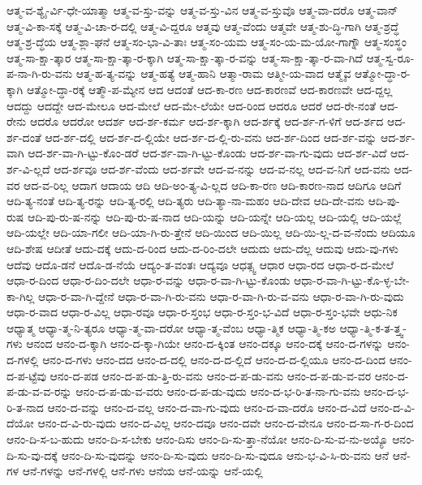 {ಆತ್ಮ-ವ-ಶ್ಯೈ-ರ್ವಿ-ಧೇ-ಯಾತ್ಮಾ
ಆತ್ಮ-ವ-ಸ್ತು-ವನ್ನು
ಆತ್ಮ-ವ-ಸ್ತು-ವಿನ
ಆತ್ಮ-ವ-ಸ್ತುವೊ
ಆತ್ಮ-ವಾ-ದರೊ
ಆತ್ಮ-ವಾನ್
ಆತ್ಮ-ವಿ-ಕಾ-ಸಕ್ಕೆ
ಆತ್ಮ-ವಿ-ಚಾ-ರ-ದಲ್ಲಿ
ಆತ್ಮ-ವಿ-ದ್ದರೂ
ಆತ್ಮವು
ಆತ್ಮ-ವೆಂದು
ಆತ್ಮವೇ
ಆತ್ಮ-ಶು-ದ್ಧಿ-ಗಾಗಿ
ಆತ್ಮ-ಶ್ರದ್ಧೆ
ಆತ್ಮ-ಶ್ರ-ದ್ಧೆಯ
ಆತ್ಮ-ಶ್ಲಾ-ಘನೆ
ಆತ್ಮ-ಸಂ-ಭಾ-ವಿ-ತಾಃ
ಆತ್ಮ-ಸಂ-ಯಮ
ಆತ್ಮ-ಸಂ-ಯ-ಮ-ಯೋ-ಗಾಗ್ನೌ
ಆತ್ಮ-ಸಂಸ್ಥಂ
ಆತ್ಮ-ಸಾ-ಕ್ಷಾ-ತ್ಕಾರ
ಆತ್ಮ-ಸಾ-ಕ್ಷಾ-ತ್ಕಾ-ರ-ಕ್ಕಾಗಿ
ಆತ್ಮ-ಸಾ-ಕ್ಷಾ-ತ್ಕಾ-ರ-ವನ್ನು
ಆತ್ಮ-ಸಾ-ಕ್ಷಾ-ತ್ಕಾ-ರ-ವಾ-ಗಿದೆ
ಆತ್ಮ-ಸ್ವ-ರೂ-ಪ-ನಾ-ಗಿ-ರು-ವನು
ಆತ್ಮ-ಹ-ತ್ಯ-ವನ್ನು
ಆತ್ಮ-ಹತ್ಯೆ
ಆತ್ಮ-ಹಾನಿ
ಆತ್ಮಾ-ರಾಮ
ಆತ್ಮೀ-ಯ-ವಾದ
ಆತ್ಮೈವ
ಆತ್ಮೋ-ದ್ಧಾ-ರ-ಕ್ಕಾಗಿ
ಆತ್ಮೋ-ದ್ಧಾ-ರಕ್ಕೆ
ಆತ್ಮೌ-ಪ-ಮ್ಯೇನ
ಆದ
ಆದಂತೆ
ಆದ-ಕಾ-ರಣ
ಆದ-ಕಾರಣವೆ
ಆದ-ಕಾರಣವೇ
ಆದ-ದ್ದಲ್ಲ
ಆದದ್ದು
ಆದದ್ದೇ
ಆದ-ಮೇಲೂ
ಆದ-ಮೇಲೆ
ಆದ-ಮೇ-ಲೆಯೇ
ಆದ-ರಿಂದ
ಆದರೂ
ಆದರೆ
ಆದ-ರೇ-ನಂತೆ
ಆದ-ರೇನು
ಆದರೊ
ಆದರೋ
ಆದರ್ಶ
ಆದ-ರ್ಶ-ಕರ್ಮ
ಆದ-ರ್ಶ-ಕ್ಕಾಗಿ
ಆದ-ರ್ಶಕ್ಕೆ
ಆದ-ರ್ಶ-ಗ-ಳಿಗೆ
ಆದ-ರ್ಶದ
ಆದ-ರ್ಶ-ದಂತೆ
ಆದ-ರ್ಶ-ದಲ್ಲಿ
ಆದ-ರ್ಶ-ದ-ಲ್ಲಿಯೇ
ಆದ-ರ್ಶ-ದ-ಲ್ಲಿ-ರು-ವನು
ಆದ-ರ್ಶ-ದಿಂದ
ಆದ-ರ್ಶ-ವನ್ನು
ಆದ-ರ್ಶ-ವಾಗಿ
ಆದ-ರ್ಶ-ವಾ-ಗಿ-ಟ್ಟು-ಕೊಂ-ಡರೆ
ಆದ-ರ್ಶ-ವಾ-ಗಿ-ಟ್ಟು-ಕೊಂಡು
ಆದ-ರ್ಶ-ವಾ-ಗು-ವುದು
ಆದ-ರ್ಶ-ವಿದೆ
ಆದ-ರ್ಶ-ವಿ-ಲ್ಲದೆ
ಆದ-ರ್ಶವೂ
ಆದ-ರ್ಶ-ವೆಂದು
ಆದ-ರ್ಶವೇ
ಆದ-ವ-ನನ್ನು
ಆದ-ವ-ನಲ್ಲ
ಆದ-ವ-ನಿಗೆ
ಆದ-ವನು
ಆದ-ವರ
ಆದ-ವ-ರಿಲ್ಲ
ಆದಾಗ
ಆದಾಯ
ಆದಿ
ಆದಿ-ಅಂ-ತ್ಯ-ವಿ-ಲ್ಲದ
ಆದಿ-ಕಾ-ರಣ
ಆದಿ-ಕಾರಣ-ನಾದ
ಆದಿಗೂ
ಆದಿಗೆ
ಆದಿ-ತ್ಯ-ನಂತೆ
ಆದಿ-ತ್ಯ-ರನ್ನು
ಆದಿ-ತ್ಯ-ರಲ್ಲಿ
ಆದಿ-ತ್ಯರು
ಆದಿ-ತ್ಯಾ-ನಾ-ಮಹಂ
ಆದಿ-ದೇವ
ಆದಿ-ದೇ-ವನು
ಆದಿ-ಪು-ರುಷ
ಆದಿ-ಪು-ರು-ಷ-ನನ್ನು
ಆದಿ-ಪು-ರು-ಷ-ನಾದ
ಆದಿ-ಯನ್ನು
ಆದಿ-ಯನ್ನೇ
ಆದಿ-ಯಲ್ಲ
ಆದಿ-ಯಲ್ಲಿ
ಆದಿ-ಯಲ್ಲೆ
ಆದಿ-ಯಲ್ಲೇ
ಆದಿ-ಯಾ-ಗಲೀ
ಆದಿ-ಯಾ-ಗಿ-ರು-ತ್ತೇನೆ
ಆದಿ-ಯಿಂದ
ಆದಿ-ಯಿಲ್ಲ
ಆದಿ-ಯಿ-ಲ್ಲ-ದ-ವ-ನೆಂದು
ಆದಿಯೂ
ಆದಿ-ಶೇಷ
ಆದೀತೆ
ಆದು-ದಕ್ಕೆ
ಆದು-ದ-ರಿಂದ
ಆದು-ದ-ರಿಂ-ದಲೇ
ಆದುದು
ಆದು-ದೆಲ್ಲ
ಆದುವು
ಆದು-ವು-ಗಳು
ಆದೆವು
ಆದೊ-ಡನೆ
ಆದೊ-ಡ-ನೆಯೆ
ಆದ್ಯಂ-ತ-ವಂತಃ
ಆದ್ಯವೂ
ಆಧತ್ಸ್ವ
ಆಧಾರ
ಆಧಾ-ರದ
ಆಧಾ-ರ-ದ-ಮೇಲೆ
ಆಧಾ-ರ-ದಿಂದ
ಆಧಾ-ರ-ದಿಂ-ದಲೇ
ಆಧಾ-ರ-ವನ್ನು
ಆಧಾ-ರ-ವಾ-ಗಿ-ಟ್ಟು-ಕೊಂಡು
ಆಧಾ-ರ-ವಾ-ಗಿ-ಟ್ಟು-ಕೊ-ಳ್ಳ-ಬೇ-ಕಾ-ಗಿಲ್ಲ
ಆಧಾ-ರ-ವಾ-ಗಿ-ದ್ದೇನೆ
ಆಧಾ-ರ-ವಾ-ಗಿ-ರು-ವನು
ಆಧಾ-ರ-ವಾ-ಗಿ-ರು-ವ-ವನು
ಆಧಾ-ರ-ವಾ-ಗಿ-ರು-ವುದು
ಆಧಾ-ರ-ವಾದ
ಆಧಾ-ರ-ವಿಲ್ಲ
ಆಧಾ-ರವೂ
ಆಧಾ-ರ-ಸ್ತಂಭ
ಆಧಾ-ರ-ಸ್ತಂ-ಭ-ವಿದೆ
ಆಧಾ-ರ-ಸ್ತಂ-ಭವೇ
ಆಧು-ನಿಕ
ಆಧ್ಯಾತ್ಮ
ಆಧ್ಯಾ-ತ್ಮ-ನಿ-ತ್ಯರೂ
ಆಧ್ಯಾ-ತ್ಮ-ವಾ-ದರೋ
ಆಧ್ಯಾ-ತ್ಮ-ವೆಂಬ
ಆಧ್ಯಾ-ತ್ಮಿಕ
ಆಧ್ಯಾ-ತ್ಮಿ-ಕಅ
ಆಧ್ಯಾ-ತ್ಮಿ-ಕ-ತ-ತ್ತ್ವ-ಗಳು
ಆನಂದ
ಆನಂ-ದ-ಕ್ಕಾಗಿ
ಆನಂ-ದ-ಕ್ಕಾ-ಗಿಯೇ
ಆನಂ-ದ-ಕ್ಕಿಂತ
ಆನಂ-ದಕ್ಕೂ
ಆನಂ-ದಕ್ಕೆ
ಆನಂ-ದ-ಗಳನ್ನು
ಆನಂ-ದ-ಗಳಲ್ಲಿ
ಆನಂ-ದ-ಗಳು
ಆನಂ-ದದ
ಆನಂ-ದ-ದಲ್ಲಿ
ಆನಂ-ದ-ದ-ಲ್ಲಿದೆ
ಆನಂ-ದ-ದ-ಲ್ಲಿಯೂ
ಆನಂ-ದ-ದಿಂದ
ಆನಂ-ದ-ಪ-ಟ್ಟೆವು
ಆನಂ-ದ-ಪಡ
ಆನಂ-ದ-ಪ-ಡು-ತ್ತಿ-ರು-ವನು
ಆನಂ-ದ-ಪ-ಡು-ವನು
ಆನಂ-ದ-ಪ-ಡು-ವ-ವರ
ಆನಂ-ದ-ಪ-ಡು-ವ-ವ-ರನ್ನು
ಆನಂ-ದ-ಪ-ಡು-ವ-ವರು
ಆನಂ-ದ-ಪ-ಡು-ವುದು
ಆನಂ-ದ-ಭ-ರಿ-ತ-ನಾ-ಗು-ವನು
ಆನಂ-ದ-ಭ-ರಿ-ತ-ನಾದ
ಆನಂ-ದ-ವನ್ನು
ಆನಂ-ದ-ವಲ್ಲ
ಆನಂ-ದ-ವಾ-ಗು-ವುದು
ಆನಂ-ದ-ವಾ-ದರೊ
ಆನಂ-ದ-ವಿದೆ
ಆನಂ-ದ-ವಿ-ದೆಯೋ
ಆನಂ-ದ-ವಿ-ರು-ವುದು
ಆನಂ-ದ-ವಿಲ್ಲ
ಆನಂ-ದವೂ
ಆನಂ-ದವೇ
ಆನಂ-ದ-ವೇನೂ
ಆನಂ-ದ-ಸಾ-ಗ-ರ-ದಿಂದ
ಆನಂ-ದಿ-ಸ-ಬ-ಹುದು
ಆನಂ-ದಿ-ಸ-ಬೇಕು
ಆನಂ-ದಿಸು
ಆನಂ-ದಿ-ಸು-ತ್ತಾ-ನೆಯೋ
ಆನಂ-ದಿ-ಸು-ವ-ನು-ಅಯ್ಯೊ
ಆನಂ-ದಿ-ಸು-ವು-ದಕ್ಕೆ
ಆನಂ-ದಿ-ಸು-ವುದನ್ನು
ಆನಂ-ದಿ-ಸು-ವುದು
ಆನಂ-ದಿ-ಸು-ವುದೂ
ಆನು-ಭ-ವಿ-ಸಿ-ರು-ವನು
ಆನೆ
ಆನೆ-ಗಳ
ಆನೆ-ಗಳನ್ನು
ಆನೆ-ಗಳಲ್ಲಿ
ಆನೆ-ಗಳು
ಆನೆಯ
ಆನೆ-ಯನ್ನು
ಆನೆ-ಯಲ್ಲಿ
}
